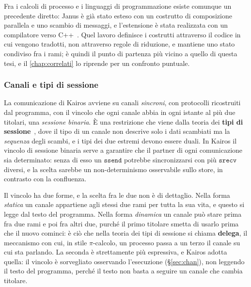 Fra i calcoli di processo e i linguaggi di programmazione esiste comunque un
precedente diretto: Janus è già stato esteso con un costrutto di composizione
parallela e uno scambio di messaggi, e l'estensione è stata realizzata con un
compilatore verso C++~\cite{Sammarchi2019}. Quel lavoro definisce i costrutti
attraverso il codice in cui vengono tradotti, non attraverso regole di
riduzione, e mantiene uno stato condiviso fra i rami; è quindi il punto di
partenza più vicino a quello di questa tesi, e il \cref{chap:correlati} lo
riprende per un confronto puntuale.

\subsubsection{Canali e tipi di sessione}

La comunicazione di Kairos avviene su canali \emph{sincroni}, con protocolli
ricostruiti dal programma,
con il vincolo che ogni canale abbia in ogni istante al più due titolari, una
\emph{sessione binaria}. È una restrizione che viene dalla teoria dei
\textbf{tipi di sessione}~\cite{HondaVasconcelosKubo1998,%
HondaYoshidaCarbone2008}, dove il tipo di un canale non descrive solo i dati
scambiati ma la \emph{sequenza} degli scambi, e i tipi dei due estremi devono
essere duali. In Kairos il vincolo di sessione binaria serve a garantire che il
partner di ogni comunicazione sia determinato: senza
di esso un $\mathtt{ssend}$ potrebbe sincronizzarsi con più $\mathtt{srecv}$
diversi, e la scelta sarebbe un non-determinismo osservabile sullo store, in
contrasto con la confluenza.

Il vincolo ha due forme, e la scelta fra le due non è di dettaglio. Nella forma
\emph{statica} un canale appartiene agli stessi due rami per tutta la sua vita,
e questo si legge dal testo del programma. Nella forma \emph{dinamica} un canale
può stare prima fra due rami e poi fra altri due, purché il primo titolare
smetta di usarlo prima che il nuovo cominci: è ciò che nella teoria dei tipi di
sessione si chiama \textbf{delega}, il meccanismo con cui, in stile
$\pi$-calcolo, un processo passa a un terzo il canale su cui sta parlando. La
seconda è strettamente più espressiva, e Kairos adotta quella: il vincolo è
sorvegliato osservando l'esecuzione (\S\ref{sec:chan}), non leggendo il testo del
programma, perché il testo non basta a seguire un canale che cambia titolare.

